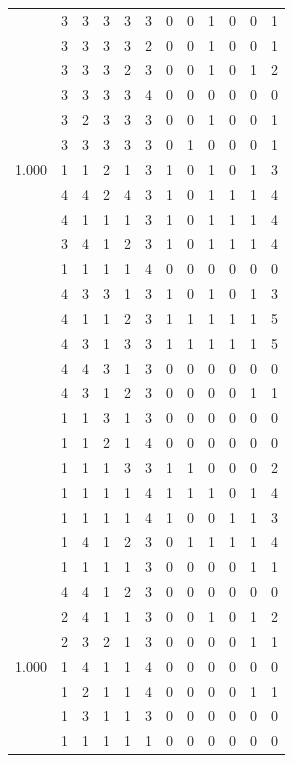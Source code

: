 \documentclass[]{msu-thesis}
\theoremstyle{definition}
\theoremstyle{definition}
\theoremstyle{definition}
\theoremstyle{remark}
\begin{document}
\begin{table}
{\begin{tabular}[t]{rrrrrrrrrrrr}
 & 3 & 3 & 3 & 3 & 3 & 0 & 0 & 1 & 0 & 0 & 1\\
 & 3 & 3 & 3 & 3 & 2 & 0 & 0 & 1 & 0 & 0 & 1\\
 & 3 & 3 & 3 & 2 & 3 & 0 & 0 & 1 & 0 & 1 & 2\\
 & 3 & 3 & 3 & 3 & 4 & 0 & 0 & 0 & 0 & 0 & 0\\
 & 3 & 2 & 3 & 3 & 3 & 0 & 0 & 1 & 0 & 0 & 1\\
 & 3 & 3 & 3 & 3 & 3 & 0 & 1 & 0 & 0 & 0 & 1\\
1.000 & 1 & 1 & 2 & 1 & 3 & 1 & 0 & 1 & 0 & 1 & 3\\
 & 4 & 4 & 2 & 4 & 3 & 1 & 0 & 1 & 1 & 1 & 4\\
 & 4 & 1 & 1 & 1 & 3 & 1 & 0 & 1 & 1 & 1 & 4\\
 & 3 & 4 & 1 & 2 & 3 & 1 & 0 & 1 & 1 & 1 & 4\\
 & 1 & 1 & 1 & 1 & 4 & 0 & 0 & 0 & 0 & 0 & 0\\
 & 4 & 3 & 3 & 1 & 3 & 1 & 0 & 1 & 0 & 1 & 3\\
 & 4 & 1 & 1 & 2 & 3 & 1 & 1 & 1 & 1 & 1 & 5\\
 & 4 & 3 & 1 & 3 & 3 & 1 & 1 & 1 & 1 & 1 & 5\\
 & 4 & 4 & 3 & 1 & 3 & 0 & 0 & 0 & 0 & 0 & 0\\
 & 4 & 3 & 1 & 2 & 3 & 0 & 0 & 0 & 0 & 1 & 1\\
 & 1 & 1 & 3 & 1 & 3 & 0 & 0 & 0 & 0 & 0 & 0\\
 & 1 & 1 & 2 & 1 & 4 & 0 & 0 & 0 & 0 & 0 & 0\\
 & 1 & 1 & 1 & 3 & 3 & 1 & 1 & 0 & 0 & 0 & 2\\
 & 1 & 1 & 1 & 1 & 4 & 1 & 1 & 1 & 0 & 1 & 4\\
 & 1 & 1 & 1 & 1 & 4 & 1 & 0 & 0 & 1 & 1 & 3\\
 & 1 & 4 & 1 & 2 & 3 & 0 & 1 & 1 & 1 & 1 & 4\\
 & 1 & 1 & 1 & 1 & 3 & 0 & 0 & 0 & 0 & 1 & 1\\
 & 4 & 4 & 1 & 2 & 3 & 0 & 0 & 0 & 0 & 0 & 0\\
 & 2 & 4 & 1 & 1 & 3 & 0 & 0 & 1 & 0 & 1 & 2\\
 & 2 & 3 & 2 & 1 & 3 & 0 & 0 & 0 & 0 & 1 & 1\\
1.000 & 1 & 4 & 1 & 1 & 4 & 0 & 0 & 0 & 0 & 0 & 0\\
 & 1 & 2 & 1 & 1 & 4 & 0 & 0 & 0 & 0 & 1 & 1\\
 & 1 & 3 & 1 & 1 & 3 & 0 & 0 & 0 & 0 & 0 & 0\\
 & 1 & 1 & 1 & 1 & 1 & 0 & 0 & 0 & 0 & 0 & 0\\

\end{tabular}}
\end{table}
\end{document}
